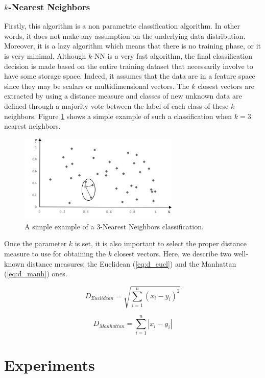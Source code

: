 \documentclass[conference]{IEEEtran}
\begin{document}
\subsubsection{$k$-Nearest Neighbors}

Firstly, this algorithm is a non parametric classification algorithm. In other words, it does not make any assumption on the underlying data distribution. Moreover, it is a lazy algorithm which means that there is no training phase, or it is very minimal. Although $k$-NN is a very fast algorithm, the final classification decision is made based on the entire training dataset that necessarily involve to have some storage space. Indeed, it assumes that the data are in a feature space since they may be scalars or multidimensional vectors. The $k$ closest vectors are extracted by using a distance measure and classes of new unknown data are defined through a majority vote between the label of each class of these $k$ neighbors. Figure \ref{fig:knn} shows a simple example of such a classification when $k=3$ nearest neighbors.

\begin{figure}[!t]
  \centering
  \includegraphics[width=3in]{knn}
  \caption{A simple example of a 3-Nearest Neighbors classification.}
  \label{fig:knn}
\end{figure}

Once the parameter $k$ is set, it is also important to select the proper distance measure to use for obtaining the $k$ closest vectors. Here, we describe two well-known distance measures: the Euclidean (\ref{eq:d_eucl}) and the Manhattan (\ref{eq:d_manh}) ones. 

\begin{equation}
	\label{eq:d_eucl}
	D_{Euclidean} = \sqrt{\sum_{i=1}^{n}(x_i-y_i)^2}
\end{equation}

\begin{equation}
	\label{eq:d_manh}
	D_{Manhattan} = \sum_{i=1}^{n}\left|x_i-y_i\right|
\end{equation}

\section{Experiments}
\end{document}
